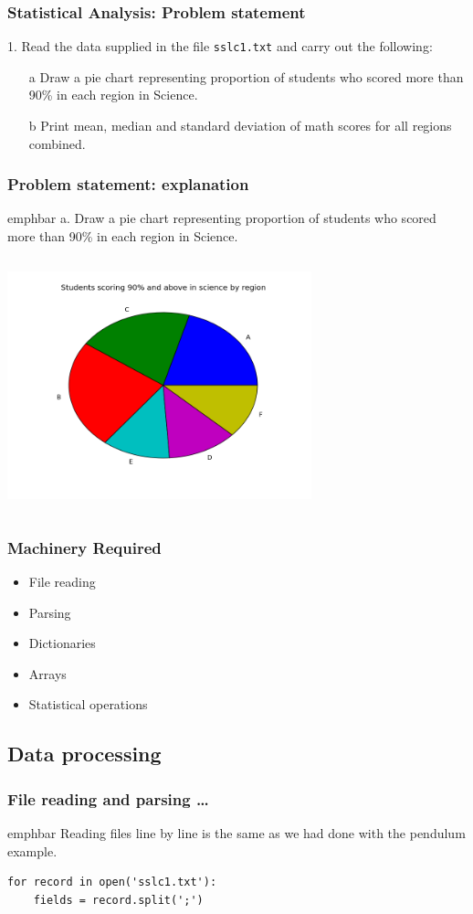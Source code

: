 \documentclass[14pt,compress]{beamer}
\newcommand{\emphbar}[1]
{\begin{beamercolorbox}[rounded=true]{emphbar} 
      {#1}
 \end{beamercolorbox}
}
\newcommand{\typ}[1]{\lstinline{#1}}
\begin{document}
\begin{frame}
  \frametitle{Statistical Analysis: Problem statement}
  1. Read the data supplied in the file \typ{sslc1.txt} and carry out the following:
  \begin{itemize}
    \item[a] Draw a pie chart representing proportion of students who scored more than 90\% in each region in Science.
    \item[b] Print mean, median and standard deviation of math scores for all regions combined.
  \end{itemize}
\end{frame}

\begin{frame}
  \frametitle{Problem statement: explanation}
    \emphbar{a. Draw a pie chart representing proportion of students who scored more than 90\% in each region in Science.}
\begin{columns}
    \hspace*{.5in}
\includegraphics[height=2.6in, interpolate=true]{data/science}
\end{columns}
\end{frame}

\begin{frame}
  \frametitle{Machinery Required}
  \begin{itemize}
    \item File reading
    \item Parsing
    \item Dictionaries 
    \item Arrays
    \item Statistical operations
  \end{itemize}
\end{frame}

\subsection{Data processing}
\begin{frame}[fragile]
  \frametitle{File reading and parsing \ldots}
\emphbar{Reading files line by line is the same as we had done with the pendulum example.}

  \begin{lstlisting}
for record in open('sslc1.txt'):
    fields = record.split(';')
  \end{lstlisting}
\end{frame}
\end{document}
